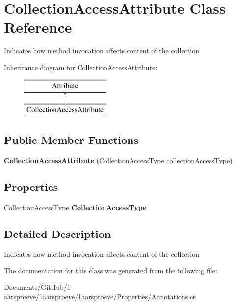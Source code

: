 \hypertarget{class_collection_access_attribute}{}\section{Collection\+Access\+Attribute Class Reference}
\label{class_collection_access_attribute}


Indicates how method invocation affects content of the collection  


Inheritance diagram for Collection\+Access\+Attribute\+:\begin{figure}[H]
\begin{center}
\leavevmode
\includegraphics[height=2.000000cm]{class_collection_access_attribute}
\end{center}
\end{figure}
\subsection*{Public Member Functions}
\begin{DoxyCompactItemize}
\item 
\hypertarget{class_collection_access_attribute_a14445128bbc836c5876b84ac71307e91}{}{\bfseries Collection\+Access\+Attribute} (Collection\+Access\+Type collection\+Access\+Type)\label{class_collection_access_attribute_a14445128bbc836c5876b84ac71307e91}

\end{DoxyCompactItemize}
\subsection*{Properties}
\begin{DoxyCompactItemize}
\item 
\hypertarget{class_collection_access_attribute_a6f4227ee9e50c5103d73637cef1a3a9e}{}Collection\+Access\+Type {\bfseries Collection\+Access\+Type}\label{class_collection_access_attribute_a6f4227ee9e50c5103d73637cef1a3a9e}

\end{DoxyCompactItemize}


\subsection{Detailed Description}
Indicates how method invocation affects content of the collection 



The documentation for this class was generated from the following file\+:\begin{DoxyCompactItemize}
\item 
Documents/\+Git\+Hub/1-\/aarsproeve/1aarsproeve/1aarsproeve/\+Properties/Annotations.\+cs\end{DoxyCompactItemize}
